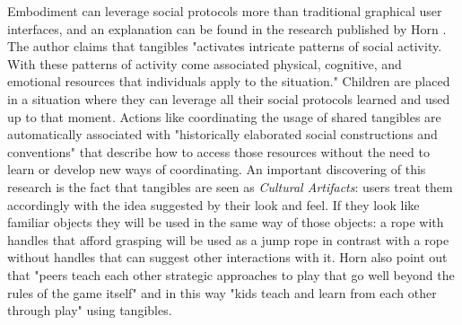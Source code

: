Embodiment can leverage social protocols more than traditional graphical user interfaces, and an explanation can be found in the research published by Horn \cite{horn:role}. The author claims that tangibles "activates intricate patterns of social activity. With these patterns of activity come associated physical, cognitive, and emotional resources that individuals apply to the situation." \cite{horn:role} Children are placed in a situation where they can leverage all their social protocols learned and used up to that moment. Actions like coordinating the usage of shared tangibles are automatically associated with "historically elaborated social constructions and conventions" \cite{horn:role} that describe how to access those resources without the need to learn or develop new ways of coordinating. An important discovering of this research is the fact that tangibles are seen as \textit{Cultural Artifacts}: users treat them accordingly with the idea suggested by their look and feel. If they look like familiar objects they will be used in the same way of those objects: a rope with handles that afford grasping will be used as a jump rope in contrast with a rope without handles that can suggest other interactions with it. Horn also point out that "peers teach each other strategic approaches to play that go well beyond the rules of the game itself" \cite{horn:role} and in this way "kids teach and learn from each other through play" \cite{horn:role} using tangibles.

